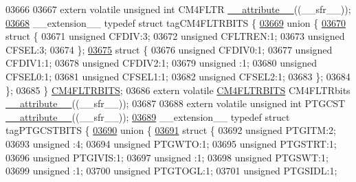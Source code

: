 \begin{DoxyCode}
03666 
03667 \textcolor{keyword}{extern} \textcolor{keyword}{volatile} \textcolor{keywordtype}{unsigned} \textcolor{keywordtype}{int}  CM4FLTR \hyperlink{a00015_a493c46f03454991ccc5aa7a6e1dfb2a7}{\_\_attribute\_\_}((\_\_sfr\_\_));
\hypertarget{a00015_source_l03668}{}\hyperlink{a00014}{03668} \_\_extension\_\_ \textcolor{keyword}{typedef} \textcolor{keyword}{struct }tagCM4FLTRBITS \{
\hypertarget{a00015_source_l03669}{}\hyperlink{a00015}{03669}   \textcolor{keyword}{union }\{
\hypertarget{a00015_source_l03670}{}\hyperlink{a00015}{03670}     \textcolor{keyword}{struct }\{
03671       \textcolor{keywordtype}{unsigned} CFDIV:3;
03672       \textcolor{keywordtype}{unsigned} CFLTREN:1;
03673       \textcolor{keywordtype}{unsigned} CFSEL:3;
03674     \};
\hypertarget{a00015_source_l03675}{}\hyperlink{a00015}{03675}     \textcolor{keyword}{struct }\{
03676       \textcolor{keywordtype}{unsigned} CFDIV0:1;
03677       \textcolor{keywordtype}{unsigned} CFDIV1:1;
03678       \textcolor{keywordtype}{unsigned} CFDIV2:1;
03679       \textcolor{keywordtype}{unsigned} :1;
03680       \textcolor{keywordtype}{unsigned} CFSEL0:1;
03681       \textcolor{keywordtype}{unsigned} CFSEL1:1;
03682       \textcolor{keywordtype}{unsigned} CFSEL2:1;
03683     \};
03684   \};
03685 \} \hyperlink{a00014_dc/d84/a00338}{CM4FLTRBITS};
03686 \textcolor{keyword}{extern} \textcolor{keyword}{volatile} \hyperlink{a00014_dc/d84/a00338}{CM4FLTRBITS} CM4FLTRbits \hyperlink{a00015_a493c46f03454991ccc5aa7a6e1dfb2a7}{\_\_attribute\_\_}((\_\_sfr\_\_));
03687 
03688 \textcolor{keyword}{extern} \textcolor{keyword}{volatile} \textcolor{keywordtype}{unsigned} \textcolor{keywordtype}{int}  PTGCST \hyperlink{a00015_a493c46f03454991ccc5aa7a6e1dfb2a7}{\_\_attribute\_\_}((\_\_sfr\_\_));
\hypertarget{a00015_source_l03689}{}\hyperlink{a00014}{03689} \_\_extension\_\_ \textcolor{keyword}{typedef} \textcolor{keyword}{struct }tagPTGCSTBITS \{
\hypertarget{a00015_source_l03690}{}\hyperlink{a00015}{03690}   \textcolor{keyword}{union }\{
\hypertarget{a00015_source_l03691}{}\hyperlink{a00015}{03691}     \textcolor{keyword}{struct }\{
03692       \textcolor{keywordtype}{unsigned} PTGITM:2;
03693       \textcolor{keywordtype}{unsigned} :4;
03694       \textcolor{keywordtype}{unsigned} PTGWTO:1;
03695       \textcolor{keywordtype}{unsigned} PTGSTRT:1;
03696       \textcolor{keywordtype}{unsigned} PTGIVIS:1;
03697       \textcolor{keywordtype}{unsigned} :1;
03698       \textcolor{keywordtype}{unsigned} PTGSWT:1;
03699       \textcolor{keywordtype}{unsigned} :1;
03700       \textcolor{keywordtype}{unsigned} PTGTOGL:1;
03701       \textcolor{keywordtype}{unsigned} PTGSIDL:1;

\end{DoxyCode}
